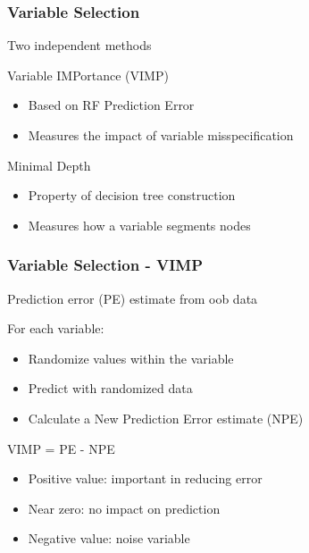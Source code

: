 \documentclass[xcolor=svgnames]{beamer}\usepackage[]{graphicx}\usepackage[]{color}
\begin{document}
\begin{frame}
\frametitle{Variable Selection}

Two independent methods

Variable IMPortance (VIMP)

\begin{itemize}
\item Based on RF Prediction Error
\item Measures the impact of variable misspecification
\end{itemize}

Minimal Depth

\begin{itemize}
\item Property of decision tree construction
\item Measures how a variable segments nodes
\end{itemize}
\end{frame}
\begin{frame}
\frametitle{Variable Selection - VIMP}

Prediction error (PE) estimate from oob data

For each variable:
\begin{itemize}
\item  Randomize values within the variable
\item Predict with randomized data
\item Calculate a New Prediction Error estimate (NPE)
\end{itemize}

VIMP = PE - NPE
\begin{itemize}
\item Positive value: important in reducing error
\item Near zero: no impact on prediction
\item Negative value: noise variable
\end{itemize}
\end{frame}
\end{document}
